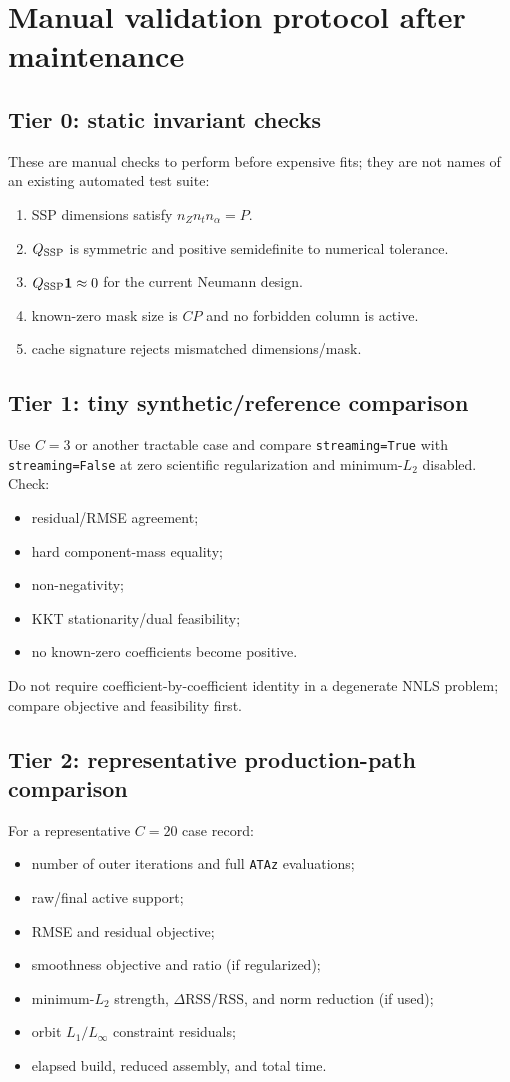 \documentclass[10pt,a4paper]{article}
\newcommand{\code}[1]{\texttt{#1}}
\begin{document}
\section{Manual validation protocol after maintenance}
\subsection{Tier 0: static invariant checks}
These are manual checks to perform before expensive fits; they are not names of an existing automated test suite:
\begin{enumerate}
\item SSP dimensions satisfy $n_Z n_t n_\alpha=P$.
\item $Q_{\rm SSP}$ is symmetric and positive semidefinite to numerical tolerance.
\item $Q_{\rm SSP}\mathbf{1}\approx0$ for the current Neumann design.
\item known-zero mask size is $CP$ and no forbidden column is active.
\item cache signature rejects mismatched dimensions/mask.
\end{enumerate}

\subsection{Tier 1: tiny synthetic/reference comparison}
Use $C=3$ or another tractable case and compare \code{streaming=True} with \code{streaming=False} at zero scientific regularization and minimum-$L_2$ disabled. Check:
\begin{itemize}
\item residual/RMSE agreement;
\item hard component-mass equality;
\item non-negativity;
\item KKT stationarity/dual feasibility;
\item no known-zero coefficients become positive.
\end{itemize}
Do not require coefficient-by-coefficient identity in a degenerate NNLS problem; compare objective and feasibility first.

\subsection{Tier 2: representative production-path comparison}
For a representative $C=20$ case record:
\begin{itemize}
\item number of outer iterations and full \code{ATAz} evaluations;
\item raw/final active support;
\item RMSE and residual objective;
\item smoothness objective and ratio (if regularized);
\item minimum-$L_2$ strength, $\Delta\mathrm{RSS}/\mathrm{RSS}$, and norm reduction (if used);
\item orbit $L_1/L_\infty$ constraint residuals;
\item elapsed build, reduced assembly, and total time.
\end{itemize}
\end{document}
